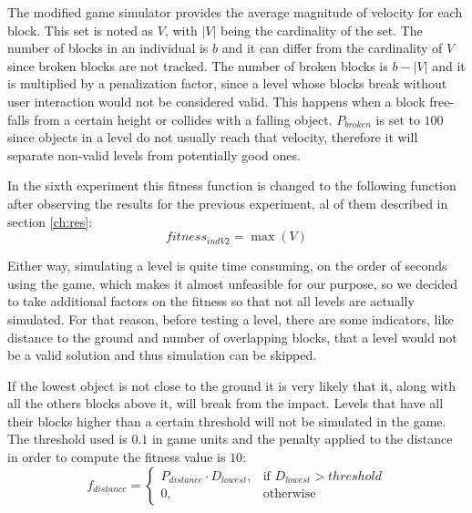 \documentclass[sigconf]{acmart}
\begin{document}
The modified 
game simulator provides the average magnitude of
velocity for each block. %
This set is noted as $V$, with $|V|$ being the cardinality of the set. The 
number of blocks in an individual is $b$ and it can differ from the cardinality 
of $V$ since broken blocks are not tracked. The number of broken blocks is 
$b-|V|$ and it is multiplied by a penalization factor, since a level whose 
blocks break without user interaction would not be considered valid. This 
happens when a block free-falls from a certain height or collides with a 
falling object. 
$P_{broken}$ is set to $100$ since objects in a level do not usually reach that 
velocity, therefore it will separate non-valid levels from potentially good 
ones.

In the sixth experiment this fitness function is changed to the following 
function after observing the results for the previous experiment, al of them 
described in section \ref{ch:res}:
$$fitness_{indV2} = \max{(V)}$$


Either way, simulating a level is quite time consuming, on the order of
seconds using the game, which makes it almost unfeasible for our purpose, so we
decided to take additional factors on the fitness so that not all
levels are actually simulated. 
For that reason, before testing a level, there are some indicators, like
distance to the ground and number of overlapping blocks, that a level would 
not be a valid solution
and thus simulation can be skipped.

If the lowest object is not close to the ground it is very likely that
it, along with all the others blocks above it, 
will break from the impact. Levels that have all their blocks higher than a 
certain threshold will not be simulated in the game. The threshold used is 
$0.1$ in game units and the penalty applied to the distance in order
to compute the fitness value is $10$:
$$f_{distance} = 
\begin{cases}
P_{distance}\cdot D_{lowest}, & \text{if } D_{lowest} > threshold\\
0, & \text{otherwise}
\end{cases}
$$
\end{document}
